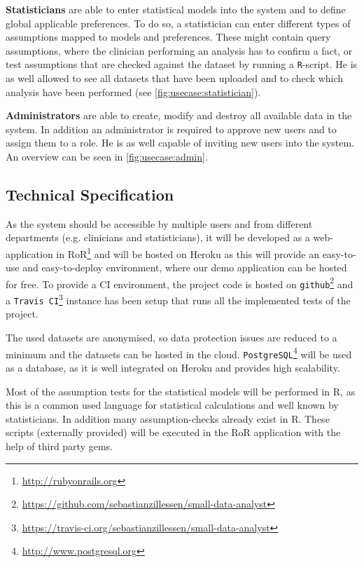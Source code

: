 \textbf{Statisticians} are able to enter statistical models into the system and to define global applicable preferences. To do so, a statistician can enter different types of assumptions mapped to models and preferences. These might contain query assumptions, where the clinician performing an analysis has to confirm a fact, or test assumptions that are checked against the dataset by running a \texttt{R}-script. He is as well allowed to see all datasets that have been uploaded and to check which analysis have been performed (see \autoref{fig:usecase:statistician}).



\textbf{Administrators} are able to create, modify and destroy all available data in the system. In addition an administrator is required to approve new users and to assign them to a role. He is as well capable of inviting new users into the system. An overview can be seen in \autoref{fig:usecase:admin}.



\subsection{Technical Specification}
\label{sub:technical}

As the system should be accessible by multiple users and from different departments (e.g. clinicians and statisticians), it will be developed as a web-application in \gls{RoR}\footnote{\href{http://rubyonrails.org}{http://rubyonrails.org}} and will be hosted on \gls{Heroku} as this will provide an easy-to-use and easy-to-deploy environment, where our demo application can be hosted for free. To provide a \gls{CI} environment, the project code is hosted on \texttt{github}\footnote{\href{https://github.com/sebastianzillessen/small-data-analyst}{https://github.com/sebastianzillessen/small-data-analyst}} and a \texttt{Travis CI}\footnote{\href{https://travis-ci.org/sebastianzillessen/small-data-analyst}{https://travis-ci.org/sebastianzillessen/small-data-analyst} } instance has been setup that runs all the implemented tests of the project.

The used datasets are anonymised, so data protection issues are reduced to a minimum and the datasets can be hosted in the cloud. \texttt{PostgreSQL}\footnote{\href{http://www.postgresql.org}{http://www.postgresql.org}} will be used as a database, as it is well integrated on \gls{Heroku} and provides high scalability.

Most of the assumption tests for the statistical models will be performed in \gls{R}, as this is a common used language for statistical calculations and well known by statisticians. In addition many assumption-checks already exist in \gls{R}. These scripts (externally provided) will be executed in the \gls{RoR} application with the help of third party gems.

